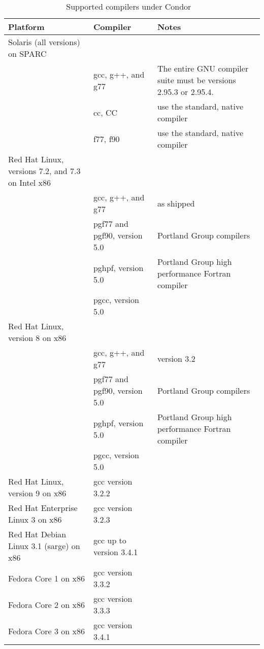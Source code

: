 \begin{center}
\begin{table}[hbt]
\begin{tabular}{|ll|l}
\textbf{Platform} & \textbf{Compiler} & \textbf{Notes}\\ \hline \hline
Solaris (all versions) on SPARC \\ 
& gcc, g++, and g77 & The entire GNU compiler suite must be versions 2.95.3 or 2.95.4. \\ 
& cc, CC & use the standard, native compiler \\ 
& f77, f90 & use the standard, native compiler \\ 
\hline
Red Hat Linux, versions 7.2, and 7.3 on Intel x86 \\ 
& gcc, g++, and g77 & as shipped \\ 
& pgf77 and pgf90, version 5.0 & Portland Group compilers \\ 
& pghpf, version 5.0 & Portland Group high performance Fortran compiler \\ 
& pgcc, version 5.0 \\ 
\hline
Red Hat Linux, version 8 on x86 \\ 
& gcc, g++, and g77 & version 3.2 \\ 
& pgf77 and pgf90, version 5.0 & Portland Group compilers \\ 
& pghpf, version 5.0 & Portland Group high performance Fortran compiler \\ 
& pgcc, version 5.0 \\ 
\hline
Red Hat Linux, version 9 on x86 & gcc version 3.2.2 \\ 
\hline
Red Hat Enterprise Linux 3 on x86 & gcc version 3.2.3 \\ 
\hline
Red Hat Debian Linux 3.1 (sarge) on x86 & gcc up to version 3.4.1 \\ 
\hline
Fedora Core 1 on x86 & gcc version 3.3.2 \\ 
\hline
Fedora Core 2 on x86 & gcc version 3.3.3 \\ 
\hline
Fedora Core 3 on x86 & gcc version 3.4.1 \\ 
\hline
\end{tabular}
\caption{\label{supported-compile}Supported compilers under Condor \VersionNotice\ }
\end{table}
\end{center}

